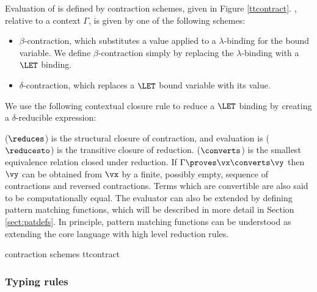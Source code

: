 Evaluation of \TT{} is defined by contraction schemes, given in Figure
\ref{ttcontract}. , relative to a context $\Gamma$, is given
by one of the following schemes:

\begin{itemize}
\item $\beta$-contraction, which substitutes a value applied to a $\lambda$-binding for
the bound variable. We define $\beta$-contraction simply by replacing the $\lambda$-binding
with a $\LET$ binding.
\item $\delta$-contraction, which replaces a $\LET$ bound variable with its value.
\end{itemize}

\noindent
We use the following contextual closure rule to reduce a $\LET$ binding by creating
a $\delta$-reducible expression:


 ($\reduces$) is the structural closure of contraction, and evaluation
is ($\reducesto$) is the transitive closure of reduction.  ($\converts$)
is the smallest equivalence relation closed under reduction. If $\Gamma\proves\vx\converts\vy$
then $\vy$ can be obtained from $\vx$ by a finite, possibly empty, sequence of
contractions and reversed contractions. Terms which are convertible are also said to
be computationally equal.
The evaluator can also be extended by defining pattern matching functions, which
will be described in more detail in Section \ref{sect:patdefs}. In principle, pattern
matching functions can be understood as extending the core language with high level
reduction rules.

{\TT{} contraction schemes}
{ttcontract}



\subsubsection{Typing rules}

\label{sect:typerules}

